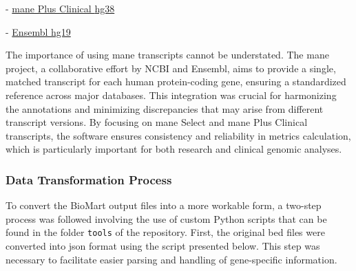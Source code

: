 - \href{http://www.ensembl.org/biomart/martview/a07a268477bc2307cce8fde9f6a88a1b?VIRTUALSCHEMANAME=default&ATTRIBUTES=hsapiens_gene_ensembl.default.structure.chromosome_name|hsapiens_gene_ensembl.default.structure.exon_chrom_start|hsapiens_gene_ensembl.default.structure.exon_chrom_end|hsapiens_gene_ensembl.default.structure.ensembl_gene_id_version|hsapiens_gene_ensembl.default.structure.external_gene_name|hsapiens_gene_ensembl.default.structure.ensembl_exon_id|hsapiens_gene_ensembl.default.structure.strand|hsapiens_gene_ensembl.default.structure.ensembl_transcript_id_version&FILTERS=hsapiens_gene_ensembl.default.filters.mane_plus_clinical.only&VISIBLEPANEL=filterpanel}{\ac{mane} Plus Clinical \ac{hg38}}

- \href{http://grch37.ensembl.org/biomart/martview/a77a9f701d17019853f36da352517c7d?VIRTUALSCHEMANAME=default&ATTRIBUTES=hsapiens_gene_ensembl.default.structure.chromosome_name|hsapiens_gene_ensembl.default.structure.exon_chrom_start|hsapiens_gene_ensembl.default.structure.exon_chrom_end|hsapiens_gene_ensembl.default.structure.ensembl_gene_id_version|hsapiens_gene_ensembl.default.structure.external_gene_name|hsapiens_gene_ensembl.default.structure.ensembl_exon_id|hsapiens_gene_ensembl.default.structure.strand|hsapiens_gene_ensembl.default.structure.ensembl_transcript_id_version&FILTERS=&VISIBLEPANEL=attributepanel}{Ensembl \ac{hg19}}

The importance of using \ac{mane} transcripts cannot be understated. The \ac{mane} project, a collaborative effort by NCBI and Ensembl, aims to provide a single, matched transcript for each human protein-coding gene, ensuring a standardized reference across major databases. This integration was crucial for harmonizing the annotations and minimizing discrepancies that may arise from different transcript versions. By focusing on \ac{mane} Select and \ac{mane} Plus Clinical transcripts, the software ensures consistency and reliability in metrics calculation, which is particularly important for both research and clinical genomic analyses.

\subsubsection{\textbf{Data Transformation Process}}

To convert the BioMart output files into a more workable form, a two-step process was followed involving the use of custom Python scripts that can be found in the folder \texttt{tools} of the repository. First, the original \ac{bed} files were converted into \ac{json} format using the script presented below. This step was necessary to facilitate easier parsing and handling of gene-specific information.

